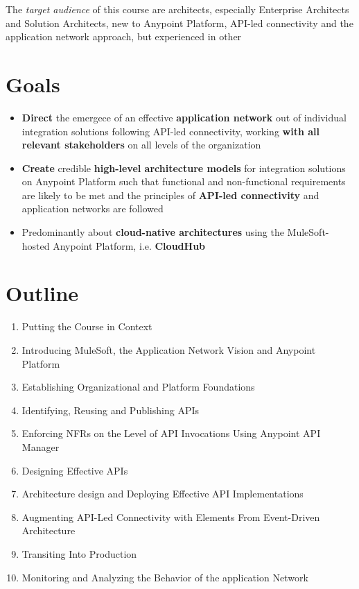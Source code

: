 \begin{mdframed}[backgroundcolor=yellow]
	The \textit{target audience} of this course are architects, especially Enterprise Architects and Solution Architects, new to Anypoint Platform, API-led connectivity and the application network approach, but experienced in other
\end{mdframed}


\section{Goals}

\begin{itemize}
	\item \textbf{Direct} the emergece of an effective \textbf{application network} out of individual integration solutions following API-led connectivity, working \textbf{with all relevant stakeholders} on all levels of the organization
	\item \textbf{Create} credible \textbf{high-level architecture models} for integration solutions on Anypoint Platform such that functional and non-functional requirements are likely to be met and the principles of \textbf{API-led connectivity} and application networks are followed 
	\item Predominantly about \textbf{cloud-native architectures} using the MuleSoft-hosted Anypoint Platform, i.e. \textbf{CloudHub} 
\end{itemize}

\section{Outline}

\begin{enumerate}
	\item Putting the Course in Context
	\item Introducing MuleSoft, the Application Network Vision and Anypoint Platform
	\item Establishing Organizational and Platform Foundations
	\item Identifying, Reusing and Publishing APIs
	\item Enforcing NFRs on the Level of API Invocations Using Anypoint API Manager
	\item Designing Effective APIs
	\item Architecture design and Deploying Effective API Implementations
	\item Augmenting API-Led Connectivity with Elements From Event-Driven Architecture
	\item Transiting Into Production
	\item Monitoring and Analyzing the Behavior of the application Network  
\end{enumerate}

